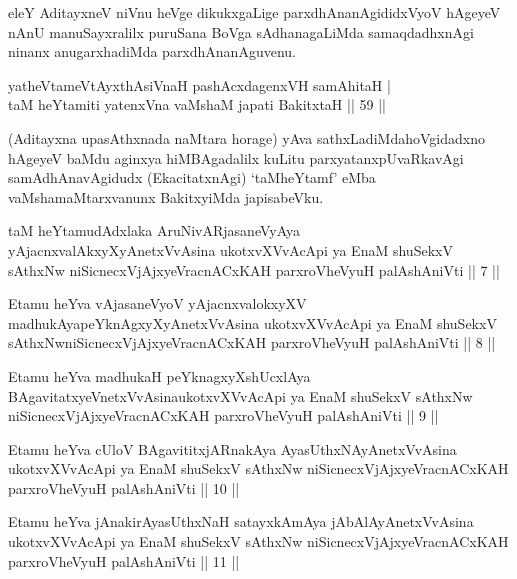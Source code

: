 \begin{artha}
eleY AditayxneV niVnu heVge dikukxgaLige parxdhAnanAgididxVyoV hAgeyeV 
nAnU manuSayxralilx puruSana BoVga sAdhanagaLiMda samaqdadhxnAgi 
ninanx anugarxhadiMda parxdhAnanAguvenu.
\end{artha}

\begin{shl}
yatheVtameVtAyxthA\s \s siVnaH pashAcxdagenxVH samAhitaH | \\
taM heYtamiti yatenxVna vaMshaM japati BakitxtaH \hfill|| 59 || 
\end{shl}

\begin{artha}
(Aditayxna upasAthxnada naMtara horage) yAva sathxLadiMda\break hoVgidadxno 
 hAgeyeV baMdu aginxya hiMBAgadalilx kuLitu parxyatanxpUvaRkavAgi 
samAdhAnavAgidudx (EkacitatxnAgi) `taMheYtamf' eMba 
vaMshamaMtarxvanunx BakitxyiMda japisabeVku.
\end{artha}

\begin{kandikeshl}
taM heYtamudAdxlaka AruNivARjasaneVyAya yAjacnxvalAkxyXyAnetxVvAsina ukotxvXVvAcApi ya EnaM shuSekxV sAthxNw niSicnecxVjAjxyeVracnACxKAH parxroVheVyuH palAshAniVti || 7 ||
\end{kandikeshl}

\begin{kandikeshl}
Etamu heYva vAjasaneVyoV yAjacnxvalokxyXV madhukAya\break peYknAgxyXyAnetxVvAsina ukotxvXVvAcApi ya EnaM shuSekxV sAthxNw\break niSicnecxVjAjxyeVracnACxKAH parxroVheVyuH palAshAniVti || 8 ||
\end{kandikeshl}

\begin{kandikeshl}
Etamu heYva madhukaH peYknagxyXshUcxlAya BAgavitatxyeV\s netxVvAsina\break ukotxvXVvAcApi ya EnaM shuSekxV sAthxNw niSicnecxVjAjxyeVracnACxKAH parxroVheVyuH palAshAniVti || 9 ||
\end{kandikeshl}

\begin{kandikeshl}
Etamu heYva cUloV BAgavititxjARnakAya AyasUthxNAyAnetxVvAsina ukotxvXVvAcApi ya EnaM shuSekxV sAthxNw niSicnecxVjAjxyeVracnACxKAH parxroVheVyuH palAshAniVti || 10 ||
\end{kandikeshl}

\begin{kandikeshl}
Etamu heYva jAnakirAyasUthxNaH satayxkAmAya jAbAlAyAnetxVvAsina ukotxvXVvAcApi ya EnaM shuSekxV sAthxNw niSicnecxVjAjxyeVracnACxKAH parxroVheVyuH palAshAniVti || 11 ||
\end{kandikeshl}

